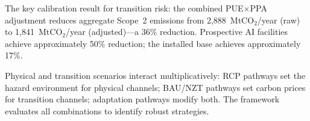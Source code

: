 The key calibration result for transition risk: the combined PUE$\times$PPA adjustment reduces aggregate Scope~2 emissions from 2{,}888~MtCO$_2$/year (raw) to 1{,}841~MtCO$_2$/year (adjusted)---a 36\% reduction. Prospective AI facilities achieve approximately 50\% reduction; the installed base achieves approximately 17\%.

Physical and transition scenarios interact multiplicatively: RCP pathways set the hazard environment for physical channels; BAU/NZT pathways set carbon prices for transition channels; adaptation pathways modify both. The framework evaluates all combinations to identify robust strategies.
